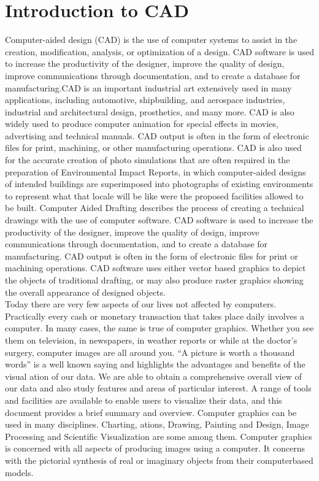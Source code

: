 \section{Introduction to CAD}
Computer-aided design (CAD) is the use of computer systems to assist in the creation, modification, analysis, or optimization of a design. CAD software is used to increase the productivity of the designer, improve the quality of design, improve communications through documentation, and to create a database for manufacturing.CAD is an important industrial art extensively used in many applications, including automotive, shipbuilding, and aerospace industries, industrial and architectural design, prosthetics, and many more. CAD is also widely used to produce computer animation for special effects in movies, advertising and technical manuals. CAD output is often in the form of electronic files for print, machining, or other manufacturing operations. CAD is also used for the accurate creation of photo simulations that are often required in the preparation of Environmental Impact Reports, in which computer-aided designs of intended buildings are superimposed into photographs of existing environments to represent what that locale will be like were the proposed facilities allowed to be built.  Computer­ Aided  Drafting  describes  the  process  of  creating  a
technical  drawings with the use of computer software. CAD software is used to increase the productivity
of  the  designer,  improve  the  quality  of  design,  improve  communications  through  documentation,  and  to
create  a  database  for  manufacturing.  CAD  output  is  often  in  the  form  of  electronic  files  for  print  or
machining  operations.  CAD  software  uses  either  vector  based  graphics  to  depict  the  objects  of
traditional  drafting,  or  may  also  produce  raster  graphics  showing  the  overall   appearance  of  designed
objects.\\


Today  there  are  very  few  aspects  of  our  lives  not  affected  by  computers.  Practically  every  cash or
monetary  transaction  that  takes  place  daily  involves  a  computer.  In  many  cases,  the  same  is  true  of
computer  graphics.  Whether  you  see  them  on  television,  in  newspapers,  in  weather   reports  or  while  at
the  doctor’s  surgery,  computer  images  are  all  around  you.  “A  picture  is  worth  a  thousand  words”  is  a
well ­known  saying  and  highlights  the  advantages  and  benefits  of  the  visual ation of our data. We
are  able  to  obtain  a  comprehensive  overall  view  of  our  data  and   also  study  features  and  areas  of
particular  interest. A  range  of  tools
and  facilities  are  available  to  enable  users  to  visualize  their  data,  and  this  document  provides  a  brief
summary  and  overview.  Computer  graphics  can  be  used  in  many  disciplines.  Charting,  ations,
Drawing,  Painting  and  Design,  Image  Processing  and  Scientific  Visualization  are  some  among  them.
Computer  graphics  is concerned with all aspects of producing images using a computer. It concerns with
the pictorial synthesis of real or imaginary objects from their computer­based models.\\


